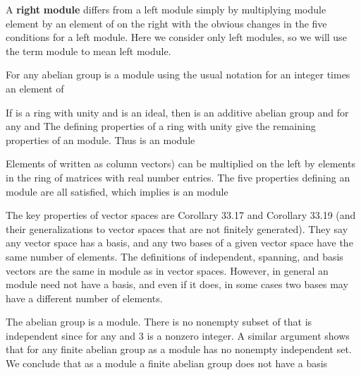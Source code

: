 \documentclass[11pt,oneside]{article}
\begin{document}
\begin{BookBody}

     \BookEnd{\blacksquare}

\noindent A\textbf{ right} \textbf{module} differs from a left module simply by multiplying module element by an element of  on the right with the obvious changes in the five conditions for a left module. Here we consider only left modules, so we will use the term module to mean left module.

 For any abelian group  is a module using the usual notation for an integer times an element of 

If  is a ring with unity and  is an ideal, then  is an additive abelian group and for any  and  The defining properties of a ring with unity give the remaining properties of an module. Thus  is an module\BookEnd{\blacktriangle}

 Elements of written as column vectors) can be multiplied on the left by elements in the ring  of  matrices with real number entries. The five properties defining an module are all satisfied, which implies  is an module\BookEnd{\blacktriangle}

\noindent The key properties of vector spaces are Corollary 33.17 and Corollary 33.19 (and their generalizations to vector spaces that are not finitely generated). They say any vector space has a basis, and any two bases of a given vector space have the same number of elements. The definitions of independent, spanning, and basis vectors are the same in module as in vector spaces. However, in general an module need not have a basis, and even if it does, in some cases two bases may have a different number of elements.

 The abelian group  is a module. There is no nonempty subset of  that is independent since for any  and 3 is a nonzero integer. A similar argument shows that for any finite abelian group  as a module  has no nonempty independent set. We conclude that as a module a finite abelian group does not have a basis\BookEnd{\blacktriangle}

\end{BookBody}
\end{document}
